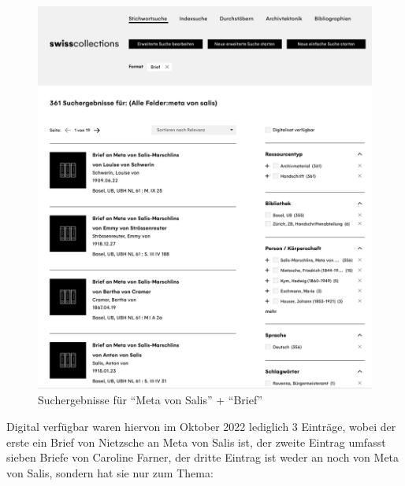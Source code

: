 \documentclass[
  letterpaper,
]{book}
\begin{document}
\begin{figure}
\begin{minipage}[t]{0.49\linewidth}
{{\includegraphics{./images/suchergebnisse_1.png}

}

\caption{Suchergebnisse für ``Meta von Salis'' + ``Brief''}

}

\end{minipage}%

\end{figure}

Digital verfügbar waren hiervon im Oktober 2022 lediglich 3 Einträge,
wobei der erste ein Brief von Nietzsche an Meta von Salis ist, der
zweite Eintrag umfasst sieben Briefe von Caroline Farner, der dritte
Eintrag ist weder an noch von Meta von Salis, sondern hat sie nur zum
Thema:
\end{document}
